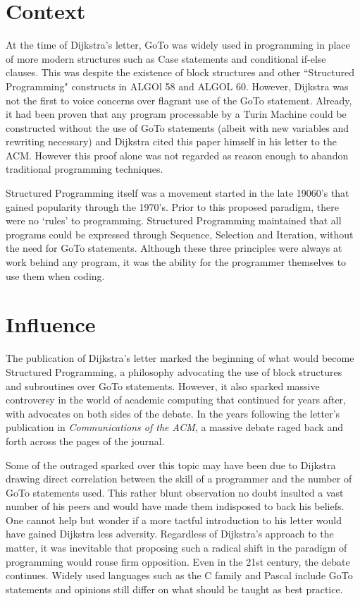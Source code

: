 \documentclass{scrartcl}
\begin{document}
\section{Context}

At the time of Dijkstra's letter, GoTo was widely used in programming in place of more modern structures such as Case statements and conditional if-else clauses. This was despite the existence of block structures and other ``Structured Programming" constructs in ALGOl 58 and ALGOL 60. \cite{algoldev} However, Dijkstra was not the first to voice concerns over flagrant use of the GoTo statement. Already, it had been proven that any program processable by a Turin Machine could be constructed without the use of GoTo statements (albeit with new variables and rewriting necessary) and Dijkstra cited this paper himself in his letter to the ACM. \cite{structuretheorem} However this proof alone was not regarded as reason enough to abandon traditional programming techniques.

Structured Programming itself was a movement started in the late 19060's that gained popularity through the 1970's. Prior to this proposed paradigm, there were no `rules' to programming. Structured Programming maintained that all programs could be expressed through Sequence, Selection and Iteration, without the need for GoTo statements. Although these three principles were always at work behind any program, it was the ability for the programmer themselves to use them when coding.

\section{Influence}

The publication of Dijkstra's letter marked the beginning of what would become Structured Programming, a philosophy advocating the use of block structures and subroutines over GoTo statements. However, it also sparked massive controversy in the world of academic computing that continued for years after, with advocates on both sides of the debate. \cite{dijkstraharmful} \cite{compromise} \cite{structuredharmful} In the years following the letter's publication in \textit{Communications of the ACM}, a massive debate raged back and forth across the pages of the journal. 

Some of the outraged sparked over this topic may have been due to Dijkstra drawing direct correlation between the skill of a programmer and the number of GoTo statements used. This rather blunt observation no doubt insulted a vast number of his peers and would have made them indisposed to back his beliefs. One cannot help but wonder if a more tactful introduction to his letter would have gained Dijkstra less adversity. Regardless of Dijkstra's approach to the matter, it was inevitable that proposing such a radical shift in the paradigm of programming would rouse firm opposition. Even in the 21st century, the debate continues. \cite{debatecont} Widely used languages such as the C family and Pascal include GoTo statements and opinions still differ on what should be taught as best practice.
\end{document}
